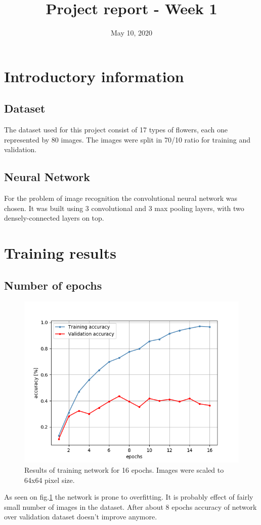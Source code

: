 

\title{Project report - Week 1}
\date{May 10, 2020}


	\maketitle
\section{Introductory information}
	\subsection{Dataset}
		The dataset used for this project consist of 17 types of flowers, each one represented by 80 images. 
		The images were split in 70/10 ratio for training and validation.
	\subsection{Neural Network}
		 For the problem of image recognition the convolutional neural network was chosen.
		 It was built using 3 convolutional and 3 max pooling layers,  with two densely-connected layers on top.
\section{Training results}
	\subsection{Number of epochs}
		\begin{figure}[h!]
			\centering
			\includegraphics[width = \textwidth]{img/epochs}
			\caption{Results of training network for 16 epochs. Images were scaled to 64x64 pixel size.}
			\label{fig:epochs}		
		\end{figure}
		As seen on fig.\ref{fig:epochs} the network is prone to overfitting. It is probably effect of fairly small number of images in the dataset.
		After about 8 epochs accuracy of network over validation dataset doesn't improve anymore.
